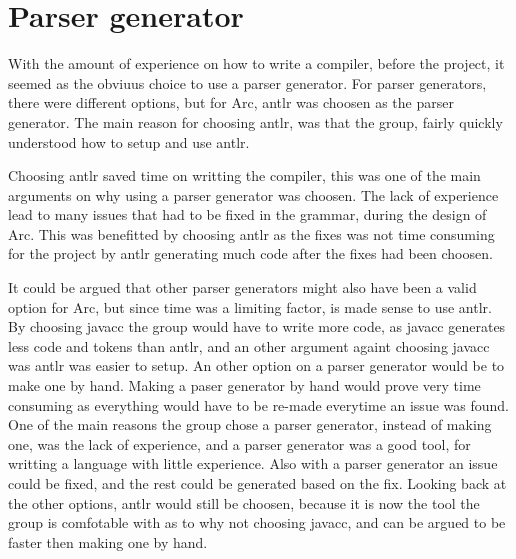 
\section{Parser generator}
With the amount of experience on how to write a compiler, before the project, it seemed as the obviuus choice to use a parser generator. For parser generators, there were different options, but for Arc, \gls{antlr} was choosen as the parser generator. The main reason for choosing \gls{antlr}, was that the group, fairly quickly understood how to setup and use \gls{antlr}. 


Choosing \gls{antlr} saved time on writting the compiler, this was one of the main arguments on why using a parser generator was choosen. The lack of experience lead to many issues that had to be fixed in the grammar, during the design of Arc. This was benefitted by choosing \gls{antlr} as the fixes was not time consuming for the project by \gls{antlr} generating much code after the fixes had been choosen. 


It could be argued that other parser generators might also have been a valid option for Arc, but since time was a limiting factor, is made sense to use \gls{antlr}. By choosing \gls{javacc} the group would have to write more code, as \gls{javacc} generates less code and tokens than \gls{antlr}, and an other argument againt choosing \gls{javacc} was \gls{antlr} was easier to setup. An other option on a parser generator would be to make one by hand. Making a paser generator by hand would prove very time consuming as everything would have to be re-made everytime an issue was found. One of the main reasons the group chose a parser generator, instead of making one, was the lack of experience, and a parser generator was a good tool, for writting a language with little experience. Also with a parser generator an issue could be fixed, and the rest could be generated based on the fix. Looking back at the other options, \gls{antlr} would still be choosen, because it is now the tool the group is comfotable with as to why not choosing \gls{javacc}, and can be argued to be faster then making one by hand.

